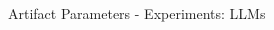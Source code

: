 \documentclass[en,16:9,smallfoot]{sdqbeamer}
\begin{document}
\begin{frame}{Artifact Parameters - Experiments: LLMs}
\begin{columns}
\begin{overlayarea}{\textwidth}{7cm}



        \end{overlayarea}
   \end{columns}

   \end{frame}
\end{document}

